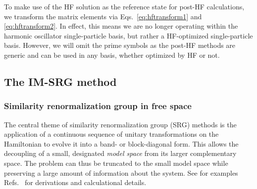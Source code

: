 To make use of the HF solution as the reference state for post-HF calculations, we transform the matrix elements via Eqs.\ \eqref{eq:hftransform1} and \eqref{eq:hftransform2}.  In effect, this means we are no longer operating within the harmonic oscillator single-particle basis, but rather a HF-optimized single-particle basis.  However, we will omit the prime symbols as the post-HF methods are generic and can be used in any basis, whether optimized by HF or not.

\subsection{The IM-SRG method}
\label{subsec:imsrgmethod}

\subsubsection{Similarity renormalization group in free space}
\label{subsubsec:srgmethods}

The central theme of similarity renormalization group (SRG) methods is the application of a continuous sequence of unitary transformations on the Hamiltonian to evolve it into a band- or block-diagonal form.  This allows the decoupling of a small, designated \textit{model space} from its larger complementary space.  The problem can thus be truncated to the small model space while preserving a large amount of information about the system.  See for examples Refs.\ \cite{kehrein2006flow,Hergert2016165,lnp936} for derivations and calculational details.

